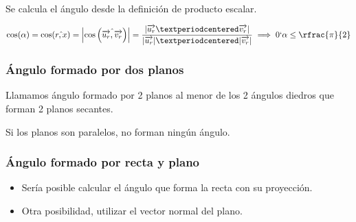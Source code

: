 Se calcula el ángulo desde la definición de producto escalar.

\[
\cos(\alpha) = \cos(\hat{r,x}) = \left| \cos\left(\hat{\vec{u_r},\vec{v_r}}\right)\right| = \frac{|\vec{u_r}·\vec{v_r}|}{|\vec{u_r}|·|\vec{v_r}|} \implies 0\lq \alpha \leq \rfrac{\pi}{2}
\]

\subsubsection{Ángulo formado por dos planos}

Llamamos ángulo formado por 2 planos al menor de los 2 ángulos diedros que forman 2 planos secantes.

\obs Si los planos son paralelos, no forman ningún ángulo.


\subsubsection{Ángulo formado por recta y plano}


\begin{itemize}
  \item Sería posible calcular el ángulo que forma la recta con su proyección. 
  \item Otra posibilidad, utilizar el vector normal del plano.
\end{itemize}

